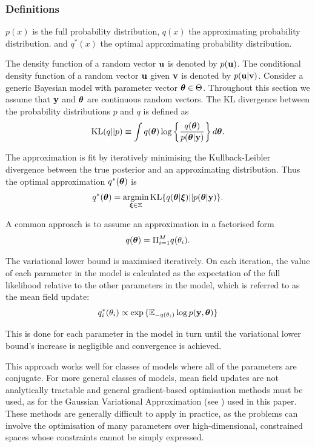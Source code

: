 \documentclass{amsart}[12pt]
\begin{document}
\subsubsection{Definitions}

$p(x)$ is the full probability distribution, $q(x)$ the approximating probability distribution.
and $q^*(x)$ the optimal approximating probability distribution.

The density function of a random vector ${\bf u}$ is denoted by $p({\bf u})$.  The conditional density function of a
random vector ${\bf u}$ given ${\bf v}$ is denoted by $p({\bf u}|{\bf v})$. Consider a generic Bayesian model with parameter
vector ${\boldsymbol \theta} \in \Theta$. Throughout this section we assume that ${\bf y}$ and ${\boldsymbol \theta}$ are continuous random
vectors. The KL divergence between the probability distributions $p$ and $q$ is defined as
$$
\text{KL}(q || p) \equiv \int q({\boldsymbol \theta}) \log \left \{ \frac{q({\boldsymbol \theta})}{p({\boldsymbol \theta} | {\bf y})} \right \} d {\boldsymbol \theta}.
$$

\noindent The approximation is fit by iteratively minimising the Kullback-Leibler divergence between the true
posterior and an approximating distribution. Thus the optimal approximation $q^*({\boldsymbol \theta})$ is
$$
q^*(\vtheta) = \argmin_{\vxi \in \Xi} \text{KL} \{ {q(\vtheta|\vxi) || p(\vtheta|\vy)} \}.
$$

\noindent A common approach is to assume an approximation in a factorised form
$$q({\boldsymbol \theta}) = \Pi_{i=1}^M q(\theta_i).$$

\noindent The variational lower bound is maximised iteratively. On each iteration, the value of each parameter
in the model is calculated as the expectation of the full likelihood relative to the other parameters in the
model, which is referred to as the mean field update:
$$q_i^*(\theta_i) \propto \exp{\{ {\mathbb E}_{-q(\theta_i)} \log p({\bf y}, {\boldsymbol\theta}) \}}$$

\noindent This is done for each parameter in the model in turn until the variational lower bound's increase is
negligible and convergence is achieved.

This approach works well for classes of models where all of the parameters are conjugate. For more
general classes of models, mean field updates are not analytically tractable and general gradient-based
optimisation methods must be used, as for the Gaussian Variational Approximation (see \citep{Ormerod2012}) used
in this paper. These methods are generally difficult to apply in practice, as the problems can involve the
optimisation of many parameters over high-dimensional, constrained spaces whose constraints cannot be simply
expressed.
\end{document}
